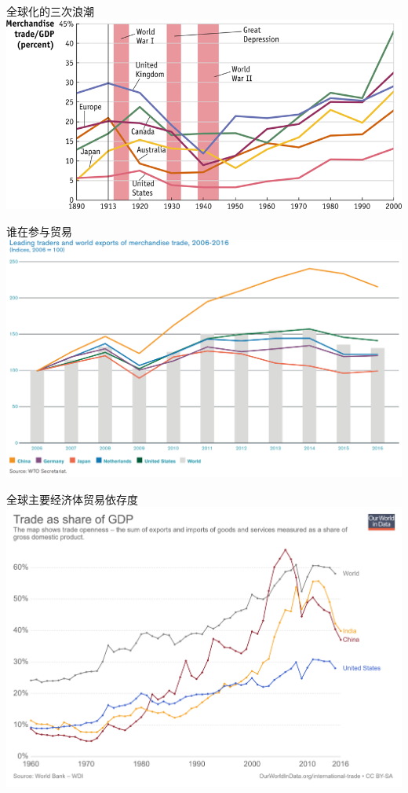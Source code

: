 \documentclass[10pt,hyperref={CJKbookmarks=true},xcolor=dvipsnames,aspectratio=169]{beamer}
\begin{document}
\begin{frame}{全球化的三次浪潮}
\centering \includegraphics[scale=0.7,]{fig/gravity/glo3}
\end{frame}


\begin{frame}{谁在参与贸易}
\centering \includegraphics[scale=0.35]{fig/gravity/leadingtraders}
\end{frame}


\begin{frame}{全球主要经济体贸易依存度}
\centering \includegraphics[scale=0.08]{fig/gravity/trade-as-share-of-gdp}
\end{frame}
\end{document}
